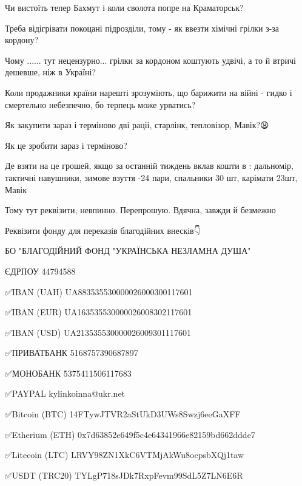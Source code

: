Чи вистоїть тепер Бахмут і коли сволота попре на Краматорськ?

Треба відігрівати покоцані підрозділи, тому - як ввезти хімічні грілки з-за
кордону?

Чому ...... тут нецензурно... грілки за кордоном коштують удвічі, а то й втричі
дешевше, ніж в Україні?

Коли продажники країни нарешті зрозуміють, що барижити на війні - гидко і
смертельно небезпечно, бо терпець може урватись?

Як закупити зараз і терміново дві раціі, старлінк, тепловізор, Мавік?😩

Як це зробити зараз і терміново?

Де взяти на це грошей, якщо за останній тиждень вклав кошти в : дальномір,
тактичні навушники, зимове взуття -24 пари, спальники 30 шт, карімати 23шт,
Мавік🤪

Тому тут реквізити, невпинно. Перепрошую. Вдячна, завжди й безмежно🙏

Реквізити фонду для переказів благодійних внесків👇

БО "БЛАГОДІЙНИЙ ФОНД "УКРАЇНСЬКА НЕЗЛАМНА ДУША" 

ЄДРПОУ 44794588  

✅IBAN (UAH) UA883535530000026000300117601

✅IBAN (EUR) UA163535530000026008302117601

✅IBAN (USD) UA213535530000026009301117601 

✅ПРИВАТБАНК 5168757390687897

✅МОНОБАНК 5375411506117683

✅PAYPAL kylinkoinna@ukr.net

✅Bitcoin (BTC) 14FTywJTVR2aStUkD3UWs8Swzj6eeGaXFF

✅Etherium (ETH) 0x7d63852e649f5c4e64341966e82159bd662ddde7

✅Litecoin (LTC) LRVY98ZN1XkC6VTMjAkWu8ocpsbXQj1taw

✅USDT (TRC20) TYLgP718sJDk7RxpFevm99SdL5Z7LN6E6R
